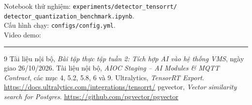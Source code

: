 \documentclass[11pt,a4paper]{article}
\begin{document}
Notebook thử nghiệm: \texttt{experiments/detector\_tensorrt/}\\
\texttt{detector\_quantization\_benchmark.ipynb}.\\
Cấu hình chạy: \texttt{configs/config.yml}.\\
Video demo: \rule{0.66\linewidth}{0.4pt}

\begin{thebibliography}{9}\small
{} Tài liệu nội bộ, \emph{Bài tập thực tập tuần 2: Tích hợp AI vào hệ thống VMS}, ngày giao 26/10/2026.
 Tài liệu nội bộ, \emph{AIOC Staging -- AI Modules \& MQTT Contract}, các mục 4, 5.2, 5.8, 6 và 9.
 Ultralytics, \emph{TensorRT Export}. \url{https://docs.ultralytics.com/integrations/tensorrt/}
 pgvector, \emph{Vector similarity search for Postgres}. \url{https://github.com/pgvector/pgvector}
\end{thebibliography}
\end{document}

